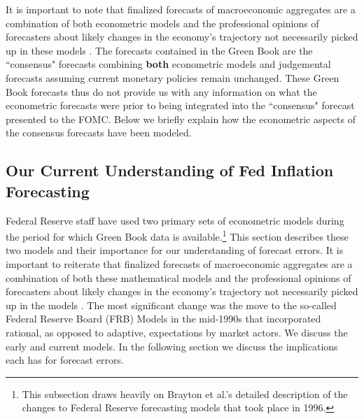 \documentclass[a4paper]{article}
\begin{document}
It is important to note that finalized forecasts of macroeconomic aggregates are a combination of both econometric models and the professional opinions of forecasters about likely changes in the economy's trajectory not necessarily picked up in these models \citep{Karamouzis1989,Reifschneider1997}. The forecasts contained in the Green Book are the ``consensus" forecasts combining {\bf{both}} econometric models and judgemental forecasts assuming current monetary policies remain unchanged. These Green Book forecasts thus do not provide us with any information on what the econometric forecasts were prior to being integrated into the ``consensus" forecast presented to the FOMC. Below we briefly explain how the econometric aspects of the consensus forecasts have been modeled.

\subsection{Our Current Understanding of Fed Inflation Forecasting}

Federal Reserve staff have used two primary sets of econometric models during the period for which Green Book data is available.\footnote{This subsection draws heavily on Brayton et al.'s \cite{Brayton1997} detailed description of the changes to Federal Reserve forecasting models that took place in 1996.} This section describes these two models and their importance for our understanding of forecast errors. It is important to reiterate that finalized forecasts of macroeconomic aggregates are a combination of both these mathematical models and the professional opinions of forecasters about likely changes in the economy's trajectory not necessarily picked up in the models \citep{Karamouzis1989,Reifschneider1997,Taylor1997}. The most significant change was the move to the so-called Federal Reserve Board (FRB) Models in the mid-1990s that incorporated rational, as opposed to adaptive, expectations by market actors. We discuss the early and current models. In the following section we discuss the implications each has for forecast errors.
\end{document}
